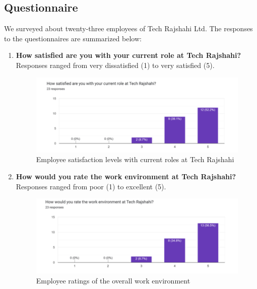 \documentclass[12pt,a4paper]{article}
\begin{document}
\subsection{Questionnaire}
We surveyed about twenty-three employees of Tech Rajshahi Ltd. The responses to the questionnaires are summarized below:

\begin{enumerate}
    \item \textbf{How satisfied are you with your current role at Tech Rajshahi?}  Responses ranged from very dissatisfied (1) to very satisfied (5).
    \begin{figure}[H]
        \centering
        \includegraphics[width=\textwidth]{Fig/role.png}
        \caption{Employee satisfaction levels with current roles at Tech Rajshahi}
        \label{fig:role_satisfaction}
    \end{figure}

    \vspace{1cm}
    \item \textbf{How would you rate the work environment at Tech Rajshahi?}  Responses ranged from poor (1) to excellent (5).
    \begin{figure}[H]
        \centering
        \includegraphics[width=\textwidth]{Fig/we.png}
        \caption{Employee ratings of the overall work environment}
        \label{fig:work_environment}
    \end{figure}


\end{enumerate}
\end{document}
